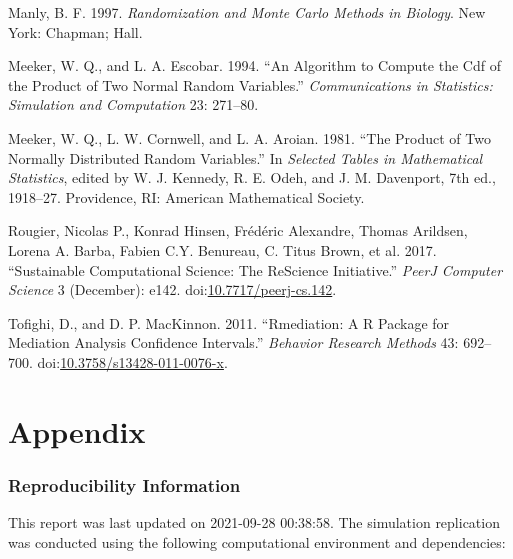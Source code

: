 \documentclass[10,a4paperpaper,]{article}
\begin{document}
\hypertarget{ref-manly97}{}
Manly, B. F. 1997. \emph{Randomization and Monte Carlo Methods in
Biology}. New York: Chapman; Hall.

\hypertarget{ref-meeker94}{}
Meeker, W. Q., and L. A. Escobar. 1994. ``An Algorithm to Compute the
Cdf of the Product of Two Normal Random Variables.''
\emph{Communications in Statistics: Simulation and Computation} 23:
271--80.

\hypertarget{ref-meeker81}{}
Meeker, W. Q., L. W. Cornwell, and L. A. Aroian. 1981. ``The Product of
Two Normally Distributed Random Variables.'' In \emph{Selected Tables in
Mathematical Statistics}, edited by W. J. Kennedy, R. E. Odeh, and J. M.
Davenport, 7th ed., 1918--27. Providence, RI: American Mathematical
Society.

\hypertarget{ref-rougier_sustainable_2017-1}{}
Rougier, Nicolas P., Konrad Hinsen, Frédéric Alexandre, Thomas Arildsen,
Lorena A. Barba, Fabien C.Y. Benureau, C. Titus Brown, et al. 2017.
``Sustainable Computational Science: The ReScience Initiative.''
\emph{PeerJ Computer Science} 3 (December): e142.
doi:\href{https://doi.org/10.7717/peerj-cs.142}{10.7717/peerj-cs.142}.

\hypertarget{ref-tofighi11}{}
Tofighi, D., and D. P. MacKinnon. 2011. ``Rmediation: A R Package for
Mediation Analysis Confidence Intervals.'' \emph{Behavior Research
Methods} 43: 692--700.
doi:\href{https://doi.org/10.3758/s13428-011-0076-x}{10.3758/s13428-011-0076-x}.

\FloatBarrier
\endgroup
\newpage

\section*{Appendix}

\subsubsection*{Reproducibility Information}

This report was last updated on 2021-09-28 00:38:58. The simulation
replication was conducted using the following computational environment
and dependencies:

\FloatBarrier
\end{document}

